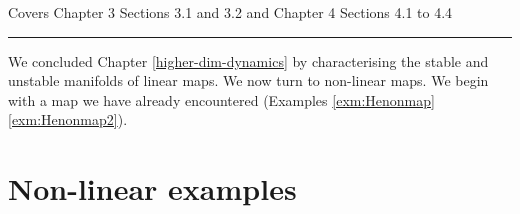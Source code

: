 \documentclass[
  a4paper,
  oneside,
  final]{krantz}
\theoremstyle{definition}
\theoremstyle{definition}
\theoremstyle{definition}
\theoremstyle{definition}
\theoremstyle{remark}
\begin{document}
Covers Chapter 3 Sections 3.1 and 3.2 and Chapter 4 Sections 4.1 to 4.4 \citep{ASY}

\begin{center}\rule{0.5\linewidth}{0.5pt}\end{center}

We concluded Chapter \ref{higher-dim-dynamics} by characterising the stable and unstable manifolds of linear maps. We now turn to non-linear maps. We begin with a map we have already encountered (Examples \ref{exm:Henonmap} \ref{exm:Henonmap2}).

\hypertarget{nonlinear-examples}{%
\section{Non-linear examples}\label{nonlinear-examples}}
\end{document}
